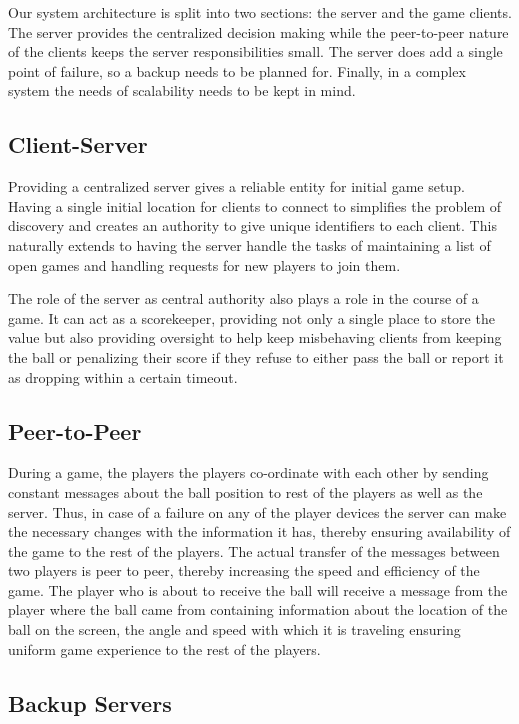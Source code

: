 \documentclass{sig-alternate}
\begin{document}
Our system architecture is split into two sections: the server and the game
clients.  The server provides the centralized decision making while the
peer-to-peer nature of the clients keeps the server responsibilities small.
The server does add a single point of failure, so a backup needs to be
planned for.  Finally, in a complex system the needs of scalability needs
to be kept in mind.

\subsection{Client-Server}

Providing a centralized server gives a reliable entity for initial game
setup.  Having a single initial location for clients to connect to
simplifies the problem of discovery and creates an authority to give unique
identifiers to each client.  This naturally extends to having the server
handle the tasks of maintaining a list of open games and handling requests
for new players to join them.

The role of the server as central authority also plays a role in the course
of a game.  It can act as a scorekeeper, providing not only a single place
to store the value but also providing oversight to help keep misbehaving
clients from keeping the ball or penalizing their score if they refuse to
either pass the ball or report it as dropping within a certain timeout.

\subsection{Peer-to-Peer}

During a game, the players the players co-ordinate with each other by
sending constant messages about the ball position to rest of the players as
well as the server.  Thus, in case of a failure on any of the player
devices the server can make the necessary changes with the information it
has, thereby ensuring availability of the game to the rest of the players.
The actual transfer of the messages between two players is peer to peer,
thereby increasing the speed and efficiency of the game.  The player who is
about to receive the ball will receive a message from the player where the
ball came from containing information about the location of the ball on the
screen, the angle and speed with which it is traveling ensuring uniform
game experience to the rest of the players.

\subsection{Backup Servers}
\end{document}
